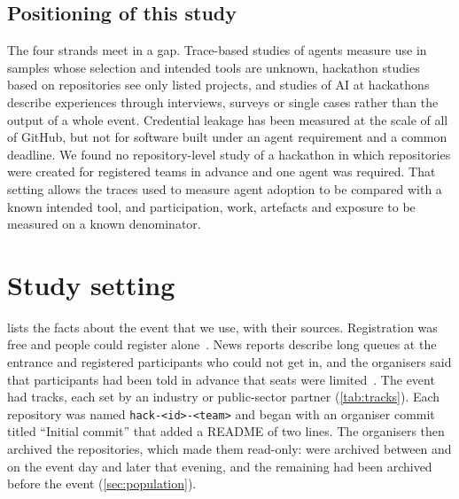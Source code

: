 \documentclass{article}
\begin{document}
\subsection{Positioning of this study}
The four strands meet in a gap. Trace-based studies of agents measure use in samples whose selection and intended tools are unknown, hackathon studies based on repositories see only listed projects, and studies of AI at hackathons describe experiences through interviews, surveys or single cases rather than the output of a whole event. Credential leakage has been measured at the scale of all of GitHub, but not for software built under an agent requirement and a common deadline. We found no repository-level study of a hackathon in which repositories were created for registered teams in advance and one agent was required. That setting allows the traces used to measure agent adoption to be compared with a known intended tool, and participation, work, artefacts and exposure to be measured on a known denominator.

\section{Study setting}\label{sec:event}

 lists the facts about the event that we use, with their sources. Registration was free and people could register alone~\cite{hackalem2026site}. News reports describe long queues at the entrance and registered participants who could not get in, and the organisers said that participants had been told in advance that seats were limited~\cite{qumash2026queue,ulys2026survival}. The event had \NTracksCount{} tracks, each set by an industry or public-sector partner (\cref{tab:tracks}). Each repository was named \texttt{hack-<id>-<team>} and began with an organiser commit titled ``Initial commit'' that added a README of two lines. The organisers then archived the repositories, which made them read-only: \NValidationArchiveWaveN{} were archived between \NValidationArchiveWaveFirst{} and \NValidationArchiveWaveLast{} on the event day and \NValidationArchiveLaterN{} later that evening, and the remaining \NRqOnePrearchivedN{} had been archived before the event (\cref{sec:population}).
\end{document}
